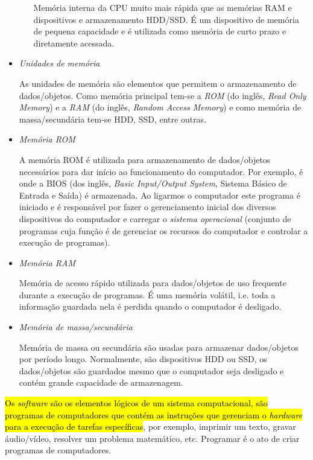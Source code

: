 \begin{itemize}
\begin{itemize}
    Memória interna da CPU muito mais rápida que as memórias RAM e dispositivos e armazenamento HDD/SSD. É um dispositivo de memória de pequena capacidade e é utilizada como memória de curto prazo e diretamente acessada.
  \end{itemize}

\item \emph{Unidades de memória}

  As unidades de memória são elementos que permitem o armazenamento de dados/objetos. Como memória principal tem-se a \emph{ROM} (do inglês, {\it Read Only Memory}) e a \emph{RAM} (do inglês, {\it Random Access Memory}) e como memória de massa/secundária tem-se HDD, SSD, entre outras.

\item \emph{Memória ROM}

  A memória ROM é utilizada para armazenamento de dados/objetos necessários para dar início ao funcionamento do computador. Por exemplo, é onde a BIOS (dos inglês, {\it Basic Input/Output System}, Sistema Básico de Entrada e Saída) é armazenada. Ao ligarmos o computador este programa é iniciado e é responsável por fazer o gerenciamento inicial dos diversos dispositivos do computador e carregar o \emph{sistema operacional} (conjunto de programas cuja função é de gerenciar os recursos do computador e controlar a execução de programas).

\item \emph{Memória RAM}

  Memória de acesso rápido utilizada para dados/objetos de uso frequente durante a execução de programas. É uma memória volátil, i.e. toda a informação guardada nela é perdida quando o computador é desligado.

\item \emph{Memória de massa/secundária}

  Memória de massa ou secundária são usadas para armazenar dados/objetos por período longo. Normalmente, são dispositivos HDD ou SSD, os dados/objetos são guardados mesmo que o computador seja desligado e contém grande capacidade de armazenagem.   
\end{itemize}

\hl{Os \emph{software} são os elementos lógicos de um sistema computacional, são programas de computadores que contém as instruções que gerenciam o \emph{hardware} para a execução de tarefas específicas}, por exemplo, imprimir um texto, gravar áudio/vídeo, resolver um problema matemático, etc. Programar é o ato de criar programas de computadores.

